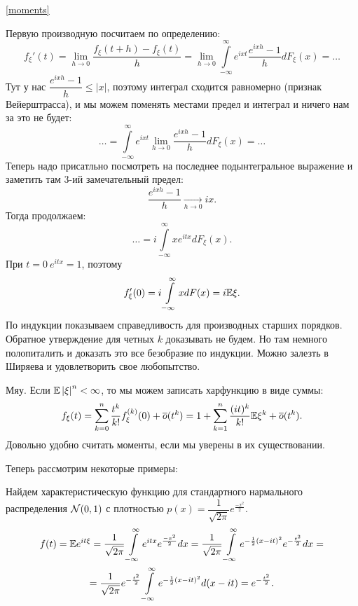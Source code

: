 \documentclass[../TV&MS.tex]{subfiles}
\begin{document}
\begin{Proof} \eqref{moments}

    Первую производную посчитаем по определению:
    \[
        f_\xi'(t) = \lim\limits_{h \rightarrow 0} \frac{f_\xi(t + h) - f_\xi(t)}{h}=
        \lim\limits_{h \rightarrow 0} \int\limits_{-\infty}^{\infty} e^{ixt} \frac{e^{ixh} - 1}{h} dF_\xi(x) = \ldots 
    \]
    Тут у нас $\dfrac{e^{ixh} - 1}{h} \leqslant \left| x \right|$,
    поэтому интеграл сходится равномерно (признак Вейерштрасса),
    и мы можем поменять местами предел и интеграл и ничего нам за это не будет:
    \[
        \ldots = \int\limits_{-\infty}^{\infty} e^{ixt} 
        \lim\limits_{h \rightarrow 0} \frac{e^{ixh} - 1}{h} dF_\xi(x) = \ldots
    \] 
    Теперь надо присатльно посмотреть на последнее подынтегральное выражение и заметить там 3-ий замечательный предел:
    \[
        \frac{e^{ixh} - 1}{h} \xrightarrow[h \rightarrow 0]{} ix
    .\] 
    Тогда продолжаем:
    \[
        \ldots = i \int\limits_{-\infty}^{\infty} xe^{itx}dF_\xi(x)
    .\]
    При $t = 0 \  e^{itx} = 1$, поэтому
    \[
        f_\xi'(0) = i \int\limits_{-\infty}^{\infty} xdF(x) = i \mathbb{E} \xi
    .\]
    По индукции показываем справедливость для производных старших порядков.
    Обратное утверждение для четных $k$ доказывать не будем. Но там немного полопиталить и доказать это все безобразие по индукции. Можно залезть в Ширяева и удовлетворить свое любопытство.
\end{Proof}

\begin{Why}
    Мяу. Если $\mathbb{E} \left| \xi \right|^n < \infty$, то мы можем записать харфункцию в виде суммы:
    \[
        f_\xi(t) = \sum\limits_{k=0}^{n} \frac{t^k}{k!}f_\xi^{(k)}(0) +\overline{o}(t^{k}) =
        1 + \sum\limits_{k=1}^{n} \frac{(it)^k}{k!} \mathbb{E} \xi^k + \overline{o}(t^{k}) 
    .\]
    Довольно удобно считать моменты, если мы уверены в их существовании.
\end{Why} 

Теперь рассмотрим некоторые примеры:

\begin{Ex}
    Найдем характеристическую функцию для стандартного нармального распределения $\mathcal{N}(0, 1)$
    с плотностью $p(x) = \dfrac{1}{\sqrt{2\pi}} e^{\frac{-x^2}{2}}$.
    \begin{multline*}
        f(t) = \mathbb{E} e^{it\xi} = 
        \frac{1}{\sqrt{2\pi}}\int\limits_{-\infty}^{\infty} e^{itx} e^{\frac{-x^2}{2}} dx =
        \frac{1}{\sqrt{2\pi}} \int\limits_{-\infty}^{\infty} 
        e^{-\frac{1}{2}(x - it)^2} e^{-\frac{t^2}{2}}dx = \\
        = \frac{1}{\sqrt{2\pi}} e^{-\frac{t^2}{2}} \int\limits_{-\infty}^{\infty}  e^{-\frac{1}{2}(x - it)^2}d(x - it) =
        e^{-\frac{t^2}{2}}
    .\end{multline*}
\end{Ex}
\end{document}
